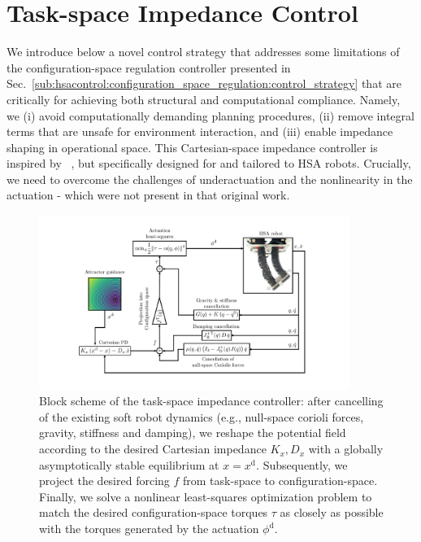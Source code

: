 \section{Task-space Impedance Control}\label{sec:hsacontrol:task_space_impedance_control}
We introduce below a novel control strategy that addresses some limitations of the configuration-space regulation controller presented in Sec.~\ref{sub:hsacontrol:configuration_space_regulation:control_strategy} that are critically for achieving both structural and computational compliance. Namely, we (i) avoid computationally demanding planning procedures, (ii) remove integral terms that are unsafe for environment interaction, and (iii) enable impedance shaping in operational space. This Cartesian-space impedance controller is inspired by ~\cite{ott2008cartesian,della2020model}, but specifically designed for and tailored to \gls{HSA} robots. Crucially, we need to overcome the challenges of underactuation and the nonlinearity in the actuation - which were not present in that original work. %

\begin{figure}
    \centering
    \includegraphics[width=0.9\textwidth]{hsacontrol/figures/control_schemes/cartesian_impedance_control/control_scheme_without_brain_control_cropped.pdf}
    \caption{Block scheme of the task-space impedance controller: after cancelling of the existing soft robot dynamics (e.g., null-space corioli forces, gravity, stiffness and damping), we reshape the potential field according to the desired Cartesian impedance $K_x, D_x$ with a globally asymptotically stable equilibrium at $x=x^\mathrm{d}$. Subsequently, we project the desired forcing $f$ from task-space to configuration-space. Finally, we solve a nonlinear least-squares optimization problem to match the desired configuration-space torques $\tau$ as closely as possible with the torques generated by the actuation $\phi^\mathrm{d}$.}
    \label{fig:hsacontrol:task_space_impedance_control:block_scheme_closed_loop_control}
\end{figure}

